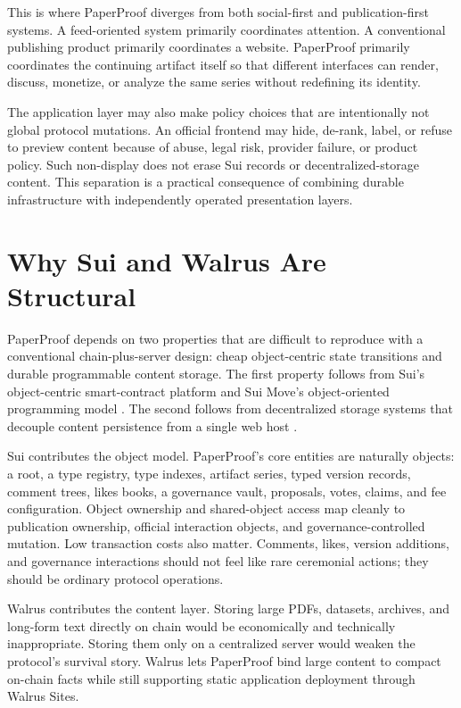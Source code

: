 \documentclass[journal]{IEEEtran}
\begin{document}
This is where PaperProof diverges from both social-first and publication-first
systems. A feed-oriented system primarily coordinates attention. A conventional
publishing product primarily coordinates a website. PaperProof primarily
coordinates the continuing artifact itself so that different interfaces can
render, discuss, monetize, or analyze the same series without redefining its
identity.

The application layer may also make policy choices that are intentionally not global protocol mutations. An official frontend may hide, de-rank, label, or refuse to preview content because of abuse, legal risk, provider failure, or product policy. Such non-display does not erase Sui records or decentralized-storage content. This separation is a practical consequence of combining durable infrastructure with independently operated presentation layers.

\section{Why Sui and Walrus Are Structural}

PaperProof depends on two properties that are difficult to reproduce with a conventional chain-plus-server design: cheap object-centric state transitions and durable programmable content storage. The first property follows from Sui's object-centric smart-contract platform \cite{mysten2022sui,sui_docs} and Sui Move's object-oriented programming model \cite{welc2023sui_move,blackshear2020move}. The second follows from decentralized storage systems that decouple content persistence from a single web host \cite{benet2014ipfs,protocol_labs2017filecoin,williams2023arweave,danezis2025walrus,walrus_docs}.

Sui contributes the object model. PaperProof's core entities are naturally objects: a root, a type registry, type indexes, artifact series, typed version records, comment trees, likes books, a governance vault, proposals, votes, claims, and fee configuration. Object ownership and shared-object access map cleanly to publication ownership, official interaction objects, and governance-controlled mutation. Low transaction costs also matter. Comments, likes, version additions, and governance interactions should not feel like rare ceremonial actions; they should be ordinary protocol operations.

Walrus contributes the content layer. Storing large PDFs, datasets, archives, and long-form text directly on chain would be economically and technically inappropriate. Storing them only on a centralized server would weaken the protocol's survival story. Walrus lets PaperProof bind large content to compact on-chain facts while still supporting static application deployment through Walrus Sites.
\end{document}
